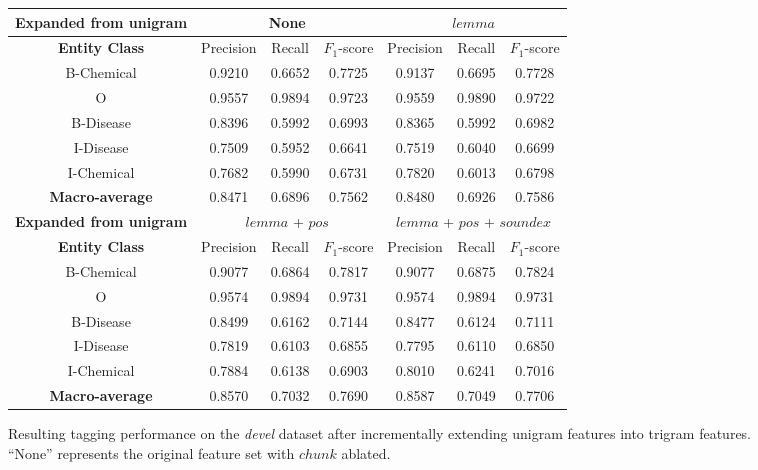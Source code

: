 \documentclass[10pt, oneside]{article}
\begin{document}
\begin{figure}[h]
\begin{center}
\fontsize{9}{11}\selectfont
\begin{tabular}{|*{7}{c|}}\hline
\textbf{Expanded from unigram}  & \multicolumn{3}{c|}{None} & \multicolumn{3}{c|}{$lemma$}  \\ \hline 
\textbf{Entity Class} & Precision & Recall & $F_1$-score & Precision & Recall & $F_1$-score  \\ \hline
B-Chemical & 0.9210 & 0.6652 & 0.7725 & 0.9137 & 0.6695 & 0.7728 \\ \hline
O                 & 0.9557 & 0.9894 & 0.9723 & 0.9559 & 0.9890 & 0.9722\\ \hline
B-Disease   & 0.8396 & 0.5992 & 0.6993 & 0.8365 & 0.5992 & 0.6982 \\ \hline
I-Disease    & 0.7509 & 0.5952 & 0.6641 & 0.7519 & 0.6040 & 0.6699 \\ \hline
I-Chemical  & 0.7682 & 0.5990 & 0.6731 & 0.7820 & 0.6013 & 0.6798 \\ \hline
\textbf{Macro-average} & 0.8471 & 0.6896 & 0.7562 & 0.8480 & 0.6926 & 0.7586 \\ \hline \hline
\textbf{Expanded from unigram}  & \multicolumn{3}{c|}{$lemma$ + $pos$} & \multicolumn{3}{c|}{$lemma$ + $pos$ + $soundex$} \\ \hline 
\textbf{Entity Class} & Precision & Recall & $F_1$-score & Precision & Recall & $F_1$-score  \\ \hline
B-Chemical & 0.9077 & 0.6864 & 0.7817 & 0.9077 & 0.6875 & 0.7824 \\ \hline
O                 & 0.9574 & 0.9894 & 0.9731 & 0.9574 & 0.9894 & 0.9731 \\ \hline
B-Disease   & 0.8499 & 0.6162 & 0.7144 & 0.8477 & 0.6124 & 0.7111 \\ \hline
I-Disease    & 0.7819 & 0.6103 & 0.6855 & 0.7795 & 0.6110 & 0.6850 \\ \hline
I-Chemical  & 0.7884 & 0.6138 & 0.6903 & 0.8010 & 0.6241 & 0.7016 \\ \hline
\textbf{Macro-average} & 0.8570 & 0.7032 & 0.7690 & 0.8587 & 0.7049 & 0.7706 \\ \hline
\end{tabular}
\caption{\label{fig:trigrams} Resulting tagging performance on the \emph{devel} dataset after incrementally extending unigram features into trigram features. ``None'' represents the original feature set with $chunk$ ablated.}
\end{center}
\end{figure}
\end{document}
